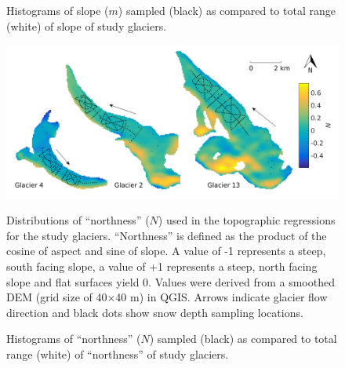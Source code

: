 \documentclass{sfuthesis}
\newcommand{\topomap}{Arrows indicate glacier flow direction and black dots show snow depth sampling locations. }
\begin{document}
\begin{figure}
	\caption{Histograms of slope ($m$) sampled (black) as compared to total range (white) of slope of study glaciers.}
	\label{sampledRange:slope}
\end{figure}

\begin{figure}
	\centering
	\includegraphics[width=\textwidth]{Map_northness.png}\\
	\caption{Distributions of ``northness'' ($N$) used in the topographic regressions for the study glaciers. ``Northness'' is defined as the product of the cosine of aspect and sine of slope. A value of -1 represents a steep, south facing slope, a value of +1 represents a steep, north facing slope and flat surfaces yield 0. Values were derived from a smoothed DEM (grid size of 40$\times$40 m) in QGIS. \topomap}
	\label{map:northness}
\end{figure}

\begin{figure}
	\caption{Histograms of ``northness'' ($N$) sampled (black) as compared to total range (white) of ``northness'' of study glaciers.}
	\label{sampledRange:northness}
\end{figure}
\end{document}
